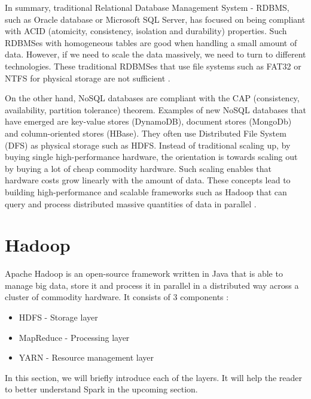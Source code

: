 In summary, traditional Relational Database Management System - RDBMS, such as Oracle database or Microsoft SQL Server, has focused on being compliant with ACID (atomicity, consistency, isolation and durability) properties. Such RDBMSes with homogeneous tables are good when handling a small amount of data. However, if we need to scale the data massively, we need to turn to different technologies. These traditional RDBMSes that use file systems such as FAT32 or NTFS for physical storage are not sufficient \cite{BigDataCourse}. %

On the other hand, NoSQL databases are compliant with the CAP (consistency, availability, partition tolerance) theorem.  Examples of new NoSQL databases that have emerged are key-value stores (DynamoDB), document stores (MongoDb) and column-oriented stores (HBase). They often use Distributed File System (DFS) as physical storage such as HDFS. Instead of traditional scaling up, by buying single high-performance hardware, the orientation is towards scaling out by buying a lot of cheap commodity hardware. Such scaling enables that hardware costs grow linearly with the amount of data.  These concepts lead to building high-performance and scalable frameworks such as Hadoop that can query and process distributed massive quantities of data in parallel \cite{BigDataCourse}. %

\section{Hadoop}
Apache Hadoop \cite{Hadoop} is an open-source framework written in Java that is able to manage big data, store it and process it in parallel in a distributed way across a cluster of commodity hardware. It consists of 3 components \cite{BigDataCourse}: %
\begin{itemize}
	\item HDFS - Storage layer
	\item MapReduce - Processing layer
	\item YARN - Resource management layer
\end{itemize}

In this section, we will briefly introduce each of the layers. It will help the reader to better understand Spark in the upcoming section.

